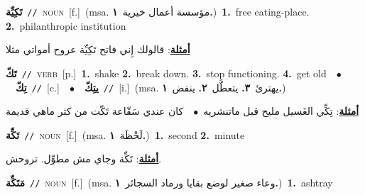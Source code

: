 \documentclass[10pt,a4paper,twoside]{article} %
\begin{document}
\begin{multicols}{2}
{\setlength\topsep{0pt}\textbf{\foreignlanguage{arabic}{تَكِيِّة}}\ {\color{gray}\texttt{//}\color{black}}\ \textsc{noun}\ [f.]\ \color{gray}(msa. \foreignlanguage{arabic}{مؤسسة أعمال خيرية}~\foreignlanguage{arabic}{\textbf{١.}})\color{black}\ \textbf{1.}~free eating-place.  \textbf{2.}~philanthropic institution\  \begin{flushright}\color{gray}\foreignlanguage{arabic}{\textbf{\underline{\foreignlanguage{arabic}{أمثلة}}}: قالولك إِني فاتح تَكِيِّة عروح أمواتي مثلا}\end{flushright}\color{black}} \vspace{2mm}

{\setlength\topsep{0pt}\textbf{\foreignlanguage{arabic}{تَكّ}}\ {\color{gray}\texttt{//}\color{black}}\ \textsc{verb}\ [p.]\ \textbf{1.}~shake  \textbf{2.}~break down.  \textbf{3.}~stop functioning.  \textbf{4.}~get old\ \ $\bullet$\ \ \setlength\topsep{0pt}\textbf{\foreignlanguage{arabic}{تِكّ}}\ {\color{gray}\texttt{//}\color{black}}\ [c.]\ \ $\bullet$\ \ \setlength\topsep{0pt}\textbf{\foreignlanguage{arabic}{يتِكّ}}\ {\color{gray}\texttt{//}\color{black}}\ [i.]\ \color{gray}(msa. \foreignlanguage{arabic}{يهترئ}~\foreignlanguage{arabic}{\textbf{٣.}}  \foreignlanguage{arabic}{يتعطَّل}~\foreignlanguage{arabic}{\textbf{٢.}}  \foreignlanguage{arabic}{ينفض}~\foreignlanguage{arabic}{\textbf{١.}})\color{black}\  \begin{flushright}\color{gray}\foreignlanguage{arabic}{\textbf{\underline{\foreignlanguage{arabic}{أمثلة}}}: تِكِّي الغَسيل مليح قبل ماتنشريه\ $\bullet$\ \  كان عندي سَقّاعة تَكّت من كثر ماهي قديمة}\end{flushright}\color{black}} \vspace{2mm}

{\setlength\topsep{0pt}\textbf{\foreignlanguage{arabic}{تَكِّة}}\ {\color{gray}\texttt{//}\color{black}}\ \textsc{noun}\ [f.]\ \color{gray}(msa. \foreignlanguage{arabic}{لَحْظَة}~\foreignlanguage{arabic}{\textbf{١.}})\color{black}\ \textbf{1.}~second  \textbf{2.}~minute\  \begin{flushright}\color{gray}\foreignlanguage{arabic}{\textbf{\underline{\foreignlanguage{arabic}{أمثلة}}}: تَكِّة وجاي مش مطوِّل. تروحش.}\end{flushright}\color{black}} \vspace{2mm}

{\setlength\topsep{0pt}\textbf{\foreignlanguage{arabic}{مَتَكِّة}}\ {\color{gray}\texttt{//}\color{black}}\ \textsc{noun}\ [f.]\ \color{gray}(msa. \foreignlanguage{arabic}{وعاء صغير لوضع بقايا ورماد السجائر}~\foreignlanguage{arabic}{\textbf{١.}})\color{black}\ \textbf{1.}~ashtray\ } \vspace{2mm}


\end{multicols}
\end{document}
